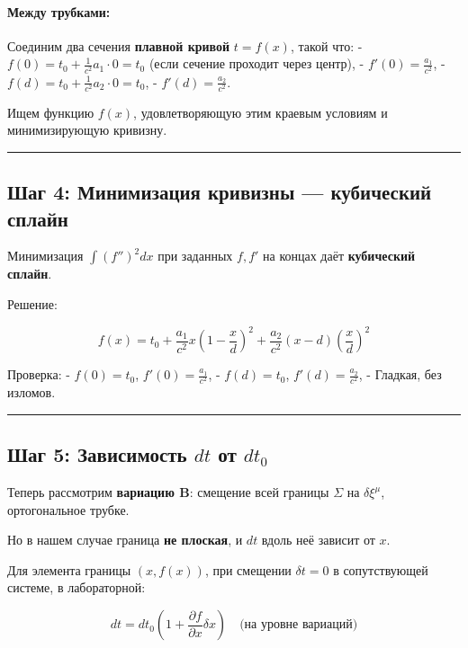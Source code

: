 \documentclass[11pt]{article}
\begin{document}
\paragraph{Между трубками:}

Соединим два сечения \textbf{плавной кривой} \(t = f(x)\), такой что: -
\(f(0) = t_0 + \frac{1}{c^2} a_1 \cdot 0 = t_0\) (если сечение проходит
через центр), - \(f'(0) = \frac{a_1}{c^2}\), -
\(f(d) = t_0 + \frac{1}{c^2} a_2 \cdot 0 = t_0\), -
\(f'(d) = \frac{a_2}{c^2}\).

 Ищем функцию \(f(x)\), удовлетворяющую этим краевым условиям и
минимизирующую кривизну.

\begin{center}\rule{0.5\linewidth}{\linethickness}\end{center}

\subsection{Шаг 4: Минимизация кривизны --- кубический сплайн}

Минимизация \(\int (f'')^2 dx\) при заданных \(f, f'\) на концах даёт
\textbf{кубический сплайн}.

Решение:

\[
f(x) = t_0 + \frac{a_1}{c^2} x \left(1 - \frac{x}{d}\right)^2 + \frac{a_2}{c^2} (x - d) \left(\frac{x}{d}\right)^2
\]

Проверка: - \(f(0) = t_0\), \(f'(0) = \frac{a_1}{c^2}\), -
\(f(d) = t_0\), \(f'(d) = \frac{a_2}{c^2}\), - Гладкая, без изломов.

\begin{center}\rule{0.5\linewidth}{\linethickness}\end{center}

\subsection{\texorpdfstring{ Шаг 5: Зависимость \(dt\) от
\(dt_0\)}{ Шаг 5: Зависимость dt от dt\_0}}

Теперь рассмотрим \textbf{вариацию B}: смещение всей границы \(\Sigma\)
на \(\delta \xi^\mu\), ортогональное трубке.

Но в нашем случае граница \textbf{не плоская}, и \(dt\) вдоль неё
зависит от \(x\).

Для элемента границы \((x, f(x))\), при смещении \(\delta t = 0\) в
сопутствующей системе, в лабораторной:

\[
dt = dt_0 \left( 1 + \frac{\partial f}{\partial x} \delta x \right)
\quad \text{(на уровне вариаций)}
\]
\end{document}

